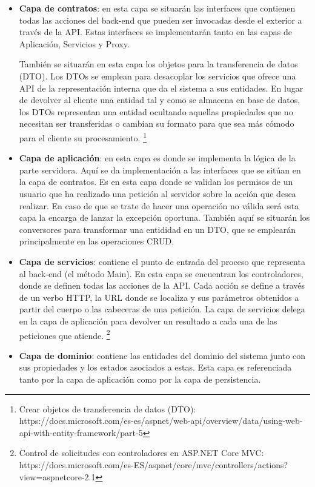 \documentclass[11pt,spanish,listoffigures]{tfgetsinf}
\begin{document}
\begin{itemize}

\item \textbf{Capa de contratos}: en esta capa se situarán las interfaces que contienen todas las acciones del back-end que pueden ser invocadas desde el exterior a través de la API. Estas interfaces se implementarán tanto en las capas de Aplicación, Servicios y Proxy. 

También se situarán en esta capa los objetos para la transferencia de datos (DTO). Los DTOs se emplean para desacoplar los servicios que ofrece una API de la representación interna que da el sistema a sus entidades. En lugar de devolver al cliente una entidad tal y como se almacena en base de datos, los DTOs representan una entidad ocultando aquellas propiedades que no necesitan ser transferidas o cambian su formato para que sea más cómodo para el cliente su procesamiento. \footnote{ Crear objetos de transferencia de datos (DTO): https://docs.microsoft.com/es-es/aspnet/web-api/overview/data/using-web-api-with-entity-framework/part-5}

\item \textbf{Capa de aplicación}: en esta capa es donde se implementa la lógica de la parte servidora. Aquí se da implementación a las interfaces que se sitúan en la capa de contratos. Es en esta capa donde se validan los permisos de un usuario que ha realizado una petición al servidor sobre la acción que desea realizar. En caso de que se trate de hacer una operación no válida será esta capa la encarga de lanzar la excepción oportuna. También aquí se situarán los conversores para transformar una entididad en un DTO, que se emplearán principalmente en las operaciones CRUD.

\item \textbf{Capa de servicios}: contiene el punto de entrada del proceso que representa al back-end (el método Main). En esta capa se encuentran los controladores, donde se definen todas las acciones de la API. Cada acción se define a través de un verbo HTTP, la URL donde se localiza y sus parámetros obtenidos a partir del cuerpo o las cabeceras de una petición. La capa de servicios delega en la capa de aplicación para devolver un resultado a cada una de las peticiones que atiende. \footnote{ Control de solicitudes con controladores en ASP.NET Core MVC: https://docs.microsoft.com/es-ES/aspnet/core/mvc/controllers/actions?view=aspnetcore-2.1}

\item \textbf{Capa de dominio}: contiene las entidades del dominio del sistema junto con sus propiedades y los estados asociados a estas. Esta capa es referenciada tanto por la capa de aplicación como por la capa de persistencia.


\end{itemize}
\end{document}
